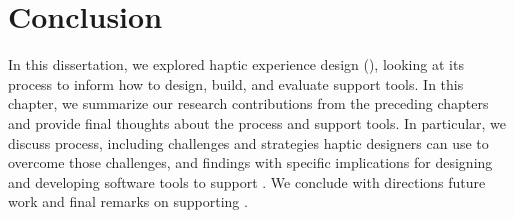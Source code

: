 \chapter{Conclusion}
\label{ch:conclusion}
In this dissertation, we explored haptic experience design (\haxd), looking at its process to inform how to design, build, and evaluate \haxd support tools.
In this chapter, we summarize our research contributions from the preceding chapters and provide final thoughts about the \haxd process and support tools.
In particular, we discuss process, including challenges and strategies haptic designers can use to overcome those challenges, and
findings with specific implications for designing and developing software tools to support \haxd.
We conclude with directions future work and final remarks on supporting \haxd.


%
%

